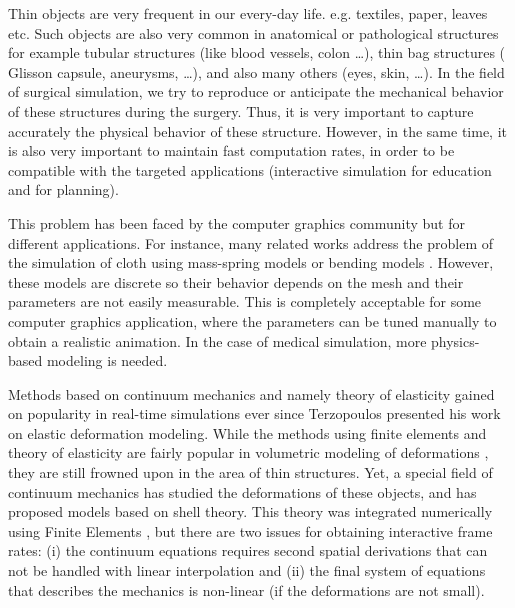 \documentclass{egpubl}
\begin{document}
Thin objects are very frequent in our every-day life. %
e.g. textiles, paper, leaves etc. 
Such objects are also very common in anatomical or pathological structures for example tubular structures (like blood vessels, colon \ldots), thin bag structures (%
Glisson capsule, aneurysms,  \ldots), and also many others (eyes, skin, \ldots). 
In the field of surgical simulation, we try to reproduce or anticipate the mechanical behavior of these structures during the surgery.
Thus, it is very important to capture accurately the physical behavior of these structure.
However, in the same time, it is also very important to maintain fast computation rates, in order to be compatible with the targeted applications (interactive simulation for education and for planning).

This problem has been faced by the computer graphics community but for different applications.
For instance, many related works address the problem of the simulation of cloth using mass-spring models \cite{Volino2009} or bending models \cite{Grinspun2003}. %
However, these models are discrete so their behavior depends on the mesh and their parameters are not easily measurable.
This is completely acceptable for some computer graphics application, where the parameters can be tuned manually to obtain a realistic animation.
In the case of medical simulation, more physics-based modeling is needed.


Methods based on continuum mechanics and namely theory of elasticity gained on popularity in real-time simulations ever since Terzopoulos \cite{Terzopoulos1987} presented his work on elastic deformation modeling.
While the methods using finite elements and theory of elasticity are fairly popular in volumetric modeling of deformations \cite{Cotin1999,Nesme2006,Miller2007}, they are still frowned upon in the area of thin structures. 
Yet, a special field of continuum mechanics has studied the deformations of these objects, and has proposed models based on shell theory.
This theory was integrated numerically using Finite Elements \cite{Reddy1993}, but there are two issues for obtaining interactive frame rates: 
(i) the continuum equations requires second spatial derivations that can not be handled with linear interpolation and 
(ii) the final system of equations that describes the mechanics is non-linear (if the deformations are not small).
\end{document}
